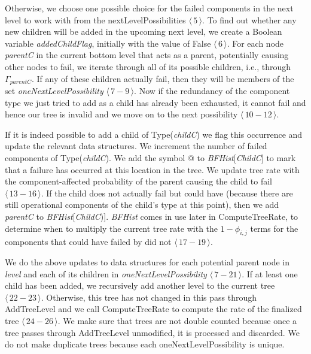 \documentclass[12pt]{article}
\newcommand{\varName}[1]{\textrm{\it#1}}
\newcommand{\citeLine}[1]{$\langle\,#1\,\rangle$}
\newcommand{\citeBlock}[2]{$\langle\,#1 - #2\,\rangle$}
\begin{document}
Otherwise, we choose one possible choice for the failed components in the next level to work with from the nextLevelPossibilities \citeLine{5}. To find out whether any new children will be added in the upcoming next level, we create a Boolean variable \varName{addedChildFlag}, initially with the value of False \citeLine{6}. For each node \varName{parentC} in the current bottom level that acts as a parent, potentially causing other nodes to fail, we iterate through all of its possible children, i.e., through $\Gamma_{parentC}$. If any of these children actually fail, then they will be members of the set \varName{oneNextLevelPossibility} \citeBlock{7}{9}. Now if the redundancy of the component type we just tried to add as a child has already been exhausted, it cannot fail and hence our tree is invalid and we move on to the next possibility \citeBlock{10}{12}.

If it is indeed possible to add a child of Type(\varName{childC}) we flag this occurrence and update the relevant data structures. We increment the number of failed components of Type(\varName{childC}). We add the symbol @ to \varName{BFHist}[\varName{ChildC}] to mark that a failure has occurred at this location in the tree. We update tree rate with the component-affected probability of the parent causing the child to fail \citeBlock{13}{16}. If the child does not actually fail but could have (because there are still operational components of the child's type at this point), then we add \varName{parentC} to \varName{BFHist}[\varName{ChildC})]. \varName{BFHist} comes in use later in ComputeTreeRate, to determine when to multiply the current tree rate with the $1-\phi_{i,j}$ terms for the components that could have failed by did not \citeBlock{17}{19}.

We do the above updates to data structures for each potential parent node in \varName{level} and each of its children in \varName{oneNextLevelPossibility} \citeBlock{7}{21}. If at least one child has been added, we recursively add another level to the current tree \citeBlock{22}{23}. Otherwise, this tree has not changed in this pass through AddTreeLevel and we call ComputeTreeRate to compute the rate of the finalized tree \citeBlock{24}{26}. We make sure that trees are not double counted because once a tree passes through AddTreeLevel unmodified, it is processed and discarded. We do not make duplicate trees because each oneNextLevelPossibility is unique.
\end{document}
